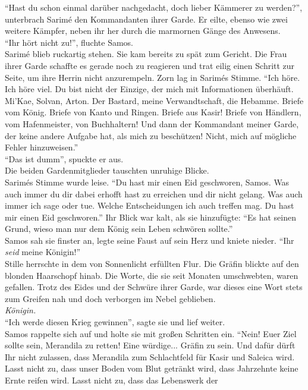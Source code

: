 ``Hast du schon einmal darüber nachgedacht, doch lieber Kämmerer zu werden?'', unterbrach Sarimé 
den Kommandanten ihrer Garde. Er eilte, ebenso wie zwei weitere Kämpfer, neben ihr her durch die 
marmornen Gänge des Anwesens.\\
``Ihr hört nicht zu!'', fluchte Samos.\\
Sarimé blieb ruckartig stehen. Sie kam bereits zu spät zum Gericht. Die Frau ihrer Garde schaffte 
es gerade noch zu reagieren und trat eilig einen Schritt zur Seite, um ihre Herrin nicht anzurempeln. 
Zorn lag in Sarimés Stimme. ``Ich höre. Ich höre viel. Du bist nicht der Einzige, der mich mit 
Informationen überhäuft. Mi'Kae, Solvan, Arton. Der Bastard, meine Verwandtschaft, die Hebamme. 
Briefe vom König. Briefe von Kanto und Ringen. Briefe aus Kasir! Briefe von Händlern, vom 
Hafenmeister, von Buchhaltern! Und dann der Kommandant meiner Garde, der keine andere Aufgabe hat, 
als mich zu beschützen! Nicht, mich auf mögliche Fehler hinzuweisen.''\\
``Das ist dumm'', spuckte er aus.\\
Die beiden Gardenmitglieder tauschten unruhige Blicke.\\
Sarimés Stimme wurde leise. ``Du hast mir einen Eid geschworen, Samos. Was auch immer du dir dabei 
erhofft hast zu erreichen und dir nicht gelang. Was auch immer ich sage oder tue. Welche 
Entscheidungen ich auch treffen mag. Du hast mir einen Eid geschworen.'' Ihr Blick war kalt, als 
sie hinzufügte: ``Es hat seinen Grund, wieso man nur dem König sein Leben schwören sollte.''\\
Samos sah sie finster an, legte seine Faust auf sein Herz und kniete nieder. ``Ihr \textit{seid} 
meine Königin!''\\
Stille herrschte in dem von Sonnenlicht erfüllten Flur. Die Gräfin blickte auf den blonden 
Haarschopf hinab. Die Worte, die sie seit Monaten umschwebten, waren gefallen. Trotz des Eides und 
der Schwüre ihrer Garde, war dieses eine Wort stets zum Greifen nah und doch verborgen im Nebel 
geblieben.\\
\textit{Königin.}\\
``Ich werde diesen Krieg gewinnen'', sagte sie und lief weiter.\\
Samos rappelte sich auf und holte sie mit großen Schritten ein. ``Nein! Euer Ziel sollte sein, 
Merandila zu retten! Eine würdige... Gräfin zu sein. Und dafür dürft Ihr nicht zulassen, dass 
Merandila zum Schlachtfeld für Kasir und Saleica wird. Lasst nicht zu, dass unser Boden vom Blut 
getränkt wird, dass Jahrzehnte keine Ernte reifen wird. Lasst nicht zu, dass das Lebenswerk der 
